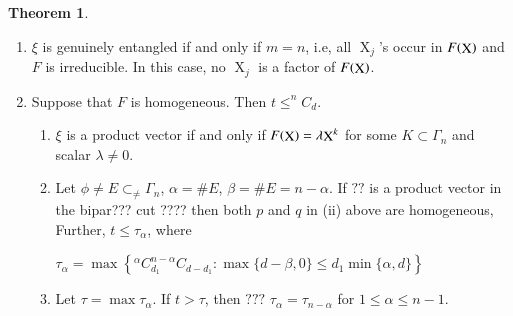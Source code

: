 \documentclass[a4paper,12pt]{article}
\DeclareMathOperator{\x}{\mathrm{X}}
\theoremstyle{definition}
\theoremstyle{underlinethm}
\newtheorem{thm}{Theorem}[section]
\theoremstyle{definition}
\begin{document}
\begin{thm}
\begin{enumerate}[label=(\roman*)]
  \item $\xi$ is genuinely entangled if and only if $m=n$, i.e, all $\x_{j}$'s occur in $F(\bold{\x})$ and $F$ is irreducible. In this case, no $\x_{j}$ is a factor of $F(\bold{\x})$.
  
  \item Suppose that $F$ is homogeneous. Then $t \leq ^{n}C_{d}$.
  
  \begin{enumerate}[label=(\alph*)] 
   \item $\xi$ is a product vector if and only if $F(\bold{\x}) = \lambda\bold{\x}^{k}$ for some $K\subset \Gamma_{n}$ and scalar $\lambda \neq 0$.
   \item Let $\phi \neq E \subset_{\neq}\Gamma_{n}$, $\alpha = \# E$, $\beta = \#E = n-\alpha$.   If $??$ is a product vector in the bipar??? cut ???? then both $p$ and $q$ in (ii) above are homogeneous, Further, $t \leq \tau_{\alpha}$, where 
   
   $\tau_{\alpha} = \max \left\{ ^{\alpha}C_{d_{1}} ^{n-\alpha}C_{d-d_{1}} : \max \{d-\beta, 0\} \leq d_{1} \min \{\alpha, d\}\right\}$ 
   
   \item Let $\tau = \max \tau_{\alpha}$. If $t > \tau$, then $???$ $\tau_{\alpha} = \tau_{n-\alpha}$ for $1 \leq \alpha \leq n-1$.
  \end{enumerate}
 \end{enumerate}
 \end{thm}
\end{document}
